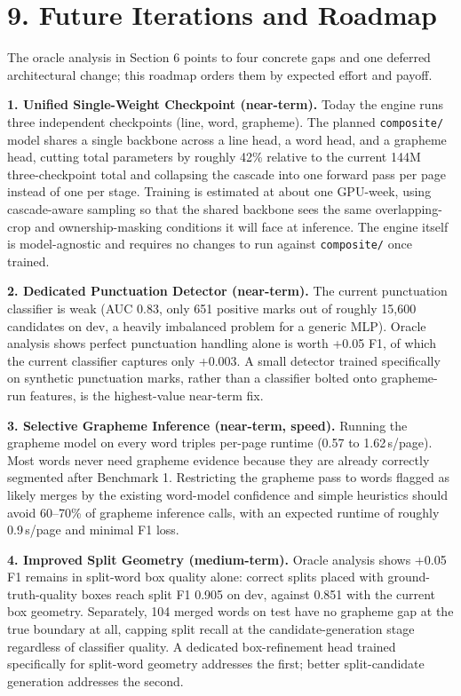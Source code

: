 \documentclass[10.5pt,a4paper]{article}
\begin{document}
\section*{9. Future Iterations and Roadmap}

The oracle analysis in Section 6 points to four concrete gaps and one deferred architectural change; this roadmap orders them by expected effort and payoff.

\textbf{1. Unified Single-Weight Checkpoint (near-term).} Today the engine runs three independent checkpoints (line, word, grapheme). The planned \texttt{composite/} model shares a single backbone across a line head, a word head, and a grapheme head, cutting total parameters by roughly 42\% relative to the current 144M three-checkpoint total and collapsing the cascade into one forward pass per page instead of one per stage. Training is estimated at about one GPU-week, using cascade-aware sampling so that the shared backbone sees the same overlapping-crop and ownership-masking conditions it will face at inference. The engine itself is model-agnostic and requires no changes to run against \texttt{composite/} once trained.

\textbf{2. Dedicated Punctuation Detector (near-term).} The current punctuation classifier is weak (AUC 0.83, only 651 positive marks out of roughly 15{,}600 candidates on dev, a heavily imbalanced problem for a generic MLP). Oracle analysis shows perfect punctuation handling alone is worth +0.05 F1, of which the current classifier captures only +0.003. A small detector trained specifically on synthetic punctuation marks, rather than a classifier bolted onto grapheme-run features, is the highest-value near-term fix.

\textbf{3. Selective Grapheme Inference (near-term, speed).} Running the grapheme model on every word triples per-page runtime (0.57 to 1.62\,s/page). Most words never need grapheme evidence because they are already correctly segmented after Benchmark 1. Restricting the grapheme pass to words flagged as likely merges by the existing word-model confidence and simple heuristics should avoid 60--70\% of grapheme inference calls, with an expected runtime of roughly 0.9\,s/page and minimal F1 loss.

\textbf{4. Improved Split Geometry (medium-term).} Oracle analysis shows +0.05 F1 remains in split-word box quality alone: correct splits placed with ground-truth-quality boxes reach split F1 0.905 on dev, against 0.851 with the current box geometry. Separately, 104 merged words on test have no grapheme gap at the true boundary at all, capping split recall at the candidate-generation stage regardless of classifier quality. A dedicated box-refinement head trained specifically for split-word geometry addresses the first; better split-candidate generation addresses the second.
\end{document}
